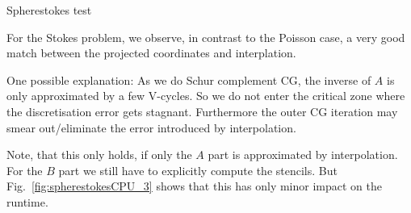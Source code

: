 \documentclass[a4paper,11pt,reqno]{amsart}
\numberwithin{figure}{section}
\numberwithin{table}{section}
\numberwithin{figure}{section}
\begin{document}
\begin{section}{Spherestokes test}


For the Stokes problem, we observe, in contrast to the Poisson case,
a very good match between the projected coordinates and interplation.

One possible explanation:
As we do Schur complement CG, the inverse of $A$ is only 
approximated by a few V-cycles. So we do not enter the 
critical zone where the discretisation error
gets stagnant. Furthermore the outer CG iteration may 
smear out/eliminate the error introduced by interpolation.

Note, that this only holds, if only the $A$ part is approximated by
interpolation. For the $B$ part we still have to explicitly compute the
stencils. But Fig.~\ref{fig:spherestokesCPU_3} shows that this has only
minor impact on the runtime.




\end{section}
\end{document}

